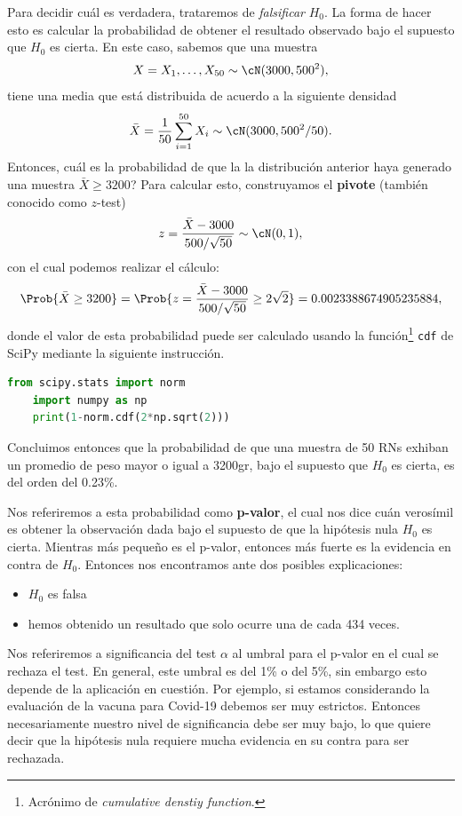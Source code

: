 Para decidir cuál es verdadera, trataremos de \emph{falsificar} $H_0$. La forma de hacer esto es calcular la probabilidad de obtener el resultado observado bajo el supuesto que $H_0$ es cierta. En este caso, sabemos que una muestra 
\begin{equation}
	X = X_1,\ldots,X_{50}\sim\cN(3000,500^2),
\end{equation}
tiene una media que está distribuida de acuerdo a la siguiente densidad 
\begin{equation}
	\bar{X} = \frac{1}{50} \sum_{i=1}^{50} X_i \sim \cN(3000,500^2/50).
\end{equation}
Entonces, cuál es la probabilidad de que la la distribución anterior haya generado una muestra $\bar{X}\geq3200$? Para calcular esto, construyamos el \textbf{pivote} (también conocido como $z$-test)
\begin{equation}
	z = \frac{\bar{X}-3000}{500/\sqrt{50}}\sim\cN(0,1),
\end{equation}
con el cual podemos realizar el cálculo:
\begin{equation}
	\Prob{\bar{X}\geq 3200} = \Prob{z = \frac{\bar{X}-3000}{500/\sqrt{50}}\geq 2\sqrt{2}} = 0.0023388674905235884,
\end{equation}
donde el valor de esta probabilidad puede ser calculado usando la función\footnote{Acrónimo de \textit{cumulative denstiy function}.} \texttt{cdf} de SciPy mediante la siguiente instrucción. 
\begin{lstlisting}[language=Python]
	from scipy.stats import norm
	import numpy as np
	print(1-norm.cdf(2*np.sqrt(2)))
\end{lstlisting}
Concluimos entonces que la probabilidad de que una muestra de 50 RNs exhiban un promedio de peso mayor o igual a 3200gr, bajo el supuesto que $H_0$ es cierta, es del orden del 0.23\%. 

Nos referiremos a esta probabilidad como \textbf{p-valor}, el cual nos dice cuán verosímil es obtener la observación dada bajo el supuesto de que la hipótesis nula $H_0$ es cierta. Mientras más pequeño es el p-valor, entonces más fuerte es la evidencia en contra de $H_0$. Entonces nos encontramos ante dos posibles explicaciones: 
\begin{itemize}
 	\item $H_0$ es falsa
 	\item hemos obtenido un resultado que solo ocurre una de cada 434 veces. 
 \end{itemize} 

Nos referiremos a significancia del test $\alpha$ al umbral para el p-valor en el cual se rechaza el test. En general, este umbral es del 1\% o del 5\%, sin embargo esto depende de la aplicación en cuestión. Por ejemplo, si estamos considerando la evaluación de la vacuna para Covid-19 debemos ser muy estrictos. Entonces necesariamente nuestro nivel de significancia debe ser muy bajo, lo que quiere decir que la hipótesis nula requiere mucha evidencia en su contra para ser rechazada. 

